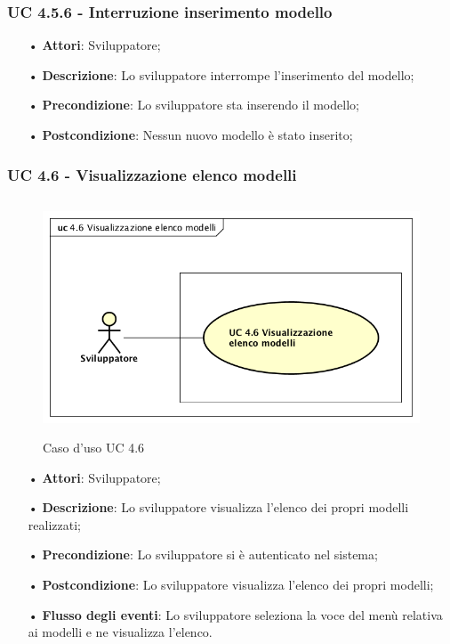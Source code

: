 \subsubsection{UC 4.5.6 - Interruzione inserimento modello}
\begin{itemize}
\item[•]\textbf{Attori}: Sviluppatore;
\item[•]\textbf{Descrizione}: Lo sviluppatore interrompe l'inserimento del modello;
\item[•]\textbf{Precondizione}: Lo sviluppatore sta inserendo il modello;
\item[•]\textbf{Postcondizione}: Nessun nuovo modello è stato inserito;
\end{itemize}

\subsubsection{UC 4.6 - Visualizzazione elenco modelli}
\begin{figure}[H]
\centering
\includegraphics[width=17cm, height=7cm]{img/UC460.png} 
\caption{Caso d'uso UC 4.6}\label{fig:460}
\end{figure}
\begin{itemize}
\item[•]\textbf{Attori}: Sviluppatore;
\item[•]\textbf{Descrizione}: Lo sviluppatore visualizza l'elenco dei propri modelli realizzati;
\item[•]\textbf{Precondizione}: Lo sviluppatore si è autenticato nel sistema;
\item[•]\textbf{Postcondizione}: Lo sviluppatore visualizza l'elenco dei propri modelli;
\item[•]\textbf{Flusso degli eventi}:  Lo sviluppatore seleziona la voce del menù relativa ai modelli e ne visualizza l'elenco.
\end{itemize}


